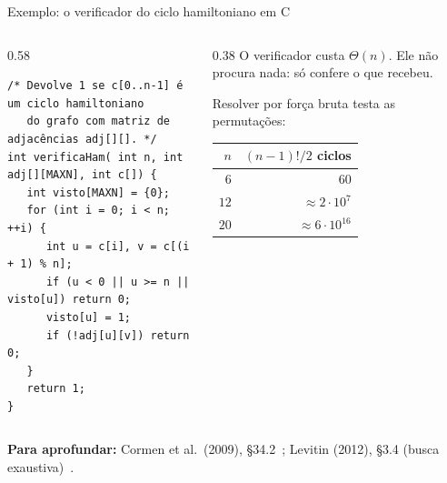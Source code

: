\documentclass[aspectratio=169,xcolor=table]{beamer}
\newcommand{\fonte}[1]{%
  \vfill
  {\tiny\color{gray!55!black}\textbf{Para aprofundar:} #1\par}%
}
\begin{document}
\begin{frame}[fragile]{Exemplo: o verificador do ciclo hamiltoniano em C}
  \begin{columns}[T]
    \begin{column}{0.58\textwidth}
\begin{lstlisting}[basicstyle=\ttfamily\tiny]
/* Devolve 1 se c[0..n-1] é um ciclo hamiltoniano
   do grafo com matriz de adjacências adj[][]. */
int verificaHam( int n, int adj[][MAXN], int c[]) {
   int visto[MAXN] = {0};
   for (int i = 0; i < n; ++i) {
      int u = c[i], v = c[(i + 1) % n];
      if (u < 0 || u >= n || visto[u]) return 0;
      visto[u] = 1;
      if (!adj[u][v]) return 0;
   }
   return 1;
}
\end{lstlisting}
    \end{column}
    \begin{column}{0.38\textwidth}
      \scriptsize
      O verificador custa $\Theta(n)$. Ele não procura nada: só confere o que recebeu.
      \medskip

      Resolver por força bruta testa as permutações:
      \smallskip

      \centering
      \begin{tabular}{rr}
        \toprule
        $n$ & $(n-1)!/2$ ciclos \\
        \midrule
        $6$ & $60$ \\
        $12$ & $\approx 2 \cdot 10^7$ \\
        $20$ & $\approx 6 \cdot 10^{16}$ \\
        \bottomrule
      \end{tabular}
    \end{column}
  \end{columns}
  \fonte{Cormen et al.\ (2009), \S 34.2~\cite{cormen2009introduction};
    Levitin (2012), \S 3.4 (busca exaustiva)~\cite{levitin2012introduction}.}
\end{frame}
\end{document}
